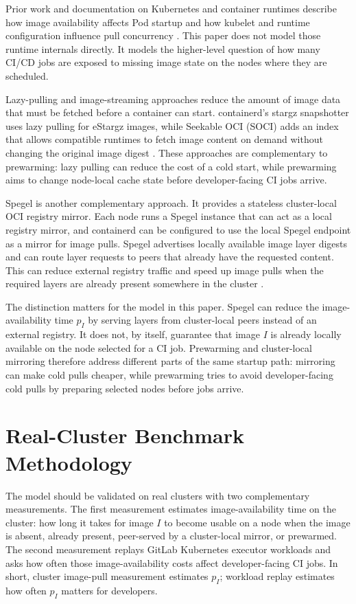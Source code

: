 \documentclass[11pt,a4paper]{article}
\begin{document}
Prior work and documentation on Kubernetes and container runtimes describe how image availability affects Pod startup and how kubelet and runtime configuration influence pull concurrency \cite{kubernetesimages,kubeletconfig,containerdcri}. This paper does not model those runtime internals directly. It models the higher-level question of how many CI/CD jobs are exposed to missing image state on the nodes where they are scheduled.

Lazy-pulling and image-streaming approaches reduce the amount of image data that must be fetched before a container can start. containerd's stargz snapshotter uses lazy pulling for eStargz images, while Seekable OCI (SOCI) adds an index that allows compatible runtimes to fetch image content on demand without changing the original image digest \cite{stargzsnapshotter,sociintro,socifargate}. These approaches are complementary to prewarming: lazy pulling can reduce the cost of a cold start, while prewarming aims to change node-local cache state before developer-facing CI jobs arrive.

Spegel is another complementary approach. It provides a stateless cluster-local OCI registry mirror. Each node runs a Spegel instance that can act as a local registry mirror, and containerd can be configured to use the local Spegel endpoint as a mirror for image pulls. Spegel advertises locally available image layer digests and can route layer requests to peers that already have the requested content. This can reduce external registry traffic and speed up image pulls when the required layers are already present somewhere in the cluster \cite{spegel,spegelarchitecture}.

The distinction matters for the model in this paper. Spegel can reduce the image-availability time \(p_I\) by serving layers from cluster-local peers instead of an external registry. It does not, by itself, guarantee that image \(I\) is already locally available on the node selected for a CI job. Prewarming and cluster-local mirroring therefore address different parts of the same startup path: mirroring can make cold pulls cheaper, while prewarming tries to avoid developer-facing cold pulls by preparing selected nodes before jobs arrive.


\section{Real-Cluster Benchmark Methodology}\label{sec:real-cluster-benchmark-methodology}

The model should be validated on real clusters with two complementary measurements. The first measurement estimates image-availability time on the cluster: how long it takes for image \(I\) to become usable on a node when the image is absent, already present, peer-served by a cluster-local mirror, or prewarmed. The second measurement replays GitLab Kubernetes executor workloads and asks how often those image-availability costs affect developer-facing CI jobs. In short, cluster image-pull measurement estimates \(p_I\); workload replay estimates how often \(p_I\) matters for developers.
\end{document}
